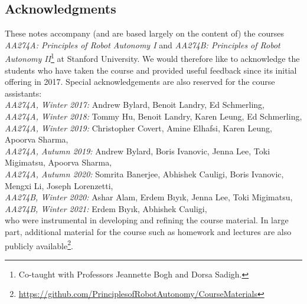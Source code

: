 \subsection*{Acknowledgments}
These notes accompany (and are based largely on the content of) the courses \textit{AA274A: Principles of Robot Autonomy I} and \textit{AA274B: Principles of Robot Autonomy II}\footnote{Co-taught with Professors Jeannette Bogh and Dorsa Sadigh.} at Stanford University. We would therefore like to acknowledge the students who have taken the course and provided useful feedback since its initial offering in 2017. Special acknowledgements are also reserved for the course assistants:\\
\emph{AA274A, Winter 2017:} Andrew Bylard, Benoit Landry, Ed Schmerling,\\
\emph{AA274A, Winter 2018:} Tommy Hu, Benoit Landry, Karen Leung, Ed Schmerling,\\
\emph{AA274A, Winter 2019:} Christopher Covert, Amine Elhafsi, Karen Leung, Apoorva Sharma,\\
\emph{AA274A, Autumn 2019:} Andrew Bylard, Boris Ivanovic, Jenna Lee,  Toki Migimatsu, Apoorva Sharma,\\
\emph{AA274A, Autumn 2020:} Somrita Banerjee, Abhishek Cauligi, Boris Ivanovic, Mengxi Li, Joseph Lorenzetti,\\
\emph{AA274B, Winter 2020:} Ashar Alam, Erdem B{\i}y{\i}k, Jenna Lee, Toki Migimatsu, \\
\emph{AA274B, Winter 2021:} Erdem B{\i}y{\i}k, Abhishek Cauligi,\\
who were instrumental in developing and refining the course material. In large part, additional material for the course such as homework and lectures are also publicly available\footnote{\url{https://github.com/PrinciplesofRobotAutonomy/CourseMaterials}}.